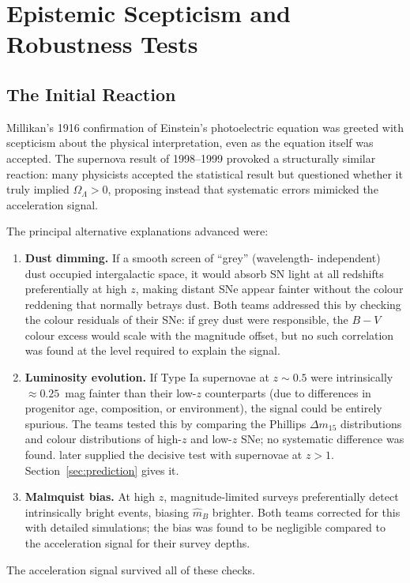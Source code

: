 \documentclass[12pt]{article}
\begin{document}
\section{Epistemic Scepticism and Robustness Tests}
\label{sec:reluctance}

\subsection{The Initial Reaction}

Millikan's 1916 confirmation of Einstein's photoelectric equation was
greeted with scepticism about the physical interpretation, even as the
equation itself was accepted.  The supernova result of 1998--1999
provoked a structurally similar reaction: many physicists accepted the
statistical result but questioned whether it truly implied $\Omega_\Lambda
> 0$, proposing instead that systematic errors mimicked the
acceleration signal.

The principal alternative explanations advanced were:
\begin{enumerate}
  \item \textbf{Dust dimming.}  If a smooth screen of ``grey'' (wavelength-
    independent) dust occupied intergalactic space, it would absorb SN
    light at all redshifts preferentially at high $z$, making distant SNe
    appear fainter without the colour reddening that normally betrays dust.
    Both teams addressed this by checking the colour residuals of their
    SNe: if grey dust were responsible, the $B-V$ colour excess would
    scale with the magnitude offset, but no such correlation was found at
    the level required to explain the signal.

  \item \textbf{Luminosity evolution.}  If Type Ia supernovae at $z \sim
    0.5$ were intrinsically $\approx 0.25$~mag fainter than their
    low-$z$ counterparts (due to differences in progenitor age, composition,
    or environment), the signal could be entirely spurious.  The teams
    tested this by comparing the Phillips $\Delta m_{15}$ distributions
    and colour distributions of high-$z$ and low-$z$ SNe; no systematic
    difference was found.  \citet{Riess2004} later supplied the
    decisive test with supernovae at $z > 1$.  Section~\ref{sec:prediction}
    gives it.

  \item \textbf{Malmquist bias.}  At high $z$, magnitude-limited surveys
    preferentially detect intrinsically bright events, biasing $\hat m_B$
    brighter.  Both teams corrected for this with detailed simulations; the
    bias was found to be negligible compared to the acceleration signal for
    their survey depths.
\end{enumerate}
The acceleration signal survived all of these checks.
\end{document}
